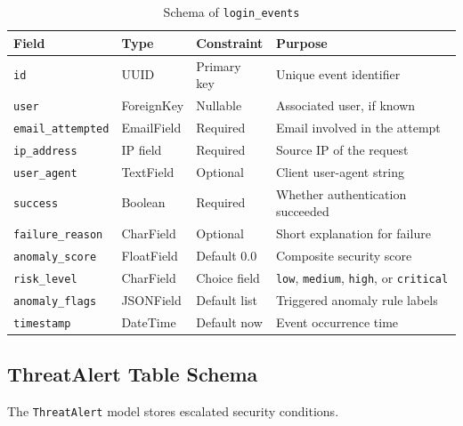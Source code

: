 \documentclass[12pt,a4paper]{report}
\begin{document}
\begin{table}[H]
\centering
\small
\caption{Schema of \texttt{login\_events}}
\label{tab:login-events}
\begin{tabular}{|p{3.0cm}|p{2.8cm}|p{1.8cm}|p{6.0cm}|}
\hline
\textbf{Field} & \textbf{Type} & \textbf{Constraint} & \textbf{Purpose} \\
\hline
\texttt{id} & UUID & Primary key & Unique event identifier \\
\hline
\texttt{user} & ForeignKey & Nullable & Associated user, if known \\
\hline
\texttt{email\_attempted} & EmailField & Required & Email involved in the attempt \\
\hline
\texttt{ip\_address} & IP field & Required & Source IP of the request \\
\hline
\texttt{user\_agent} & TextField & Optional & Client user-agent string \\
\hline
\texttt{success} & Boolean & Required & Whether authentication succeeded \\
\hline
\texttt{failure\_reason} & CharField & Optional & Short explanation for failure \\
\hline
\texttt{anomaly\_score} & FloatField & Default 0.0 & Composite security score \\
\hline
\texttt{risk\_level} & CharField & Choice field & \texttt{low}, \texttt{medium}, \texttt{high}, or \texttt{critical} \\
\hline
\texttt{anomaly\_flags} & JSONField & Default list & Triggered anomaly rule labels \\
\hline
\texttt{timestamp} & DateTime & Default now & Event occurrence time \\
\hline
\end{tabular}
\end{table}

\subsection{ThreatAlert Table Schema}
The \texttt{ThreatAlert} model stores escalated security conditions.
\end{document}
